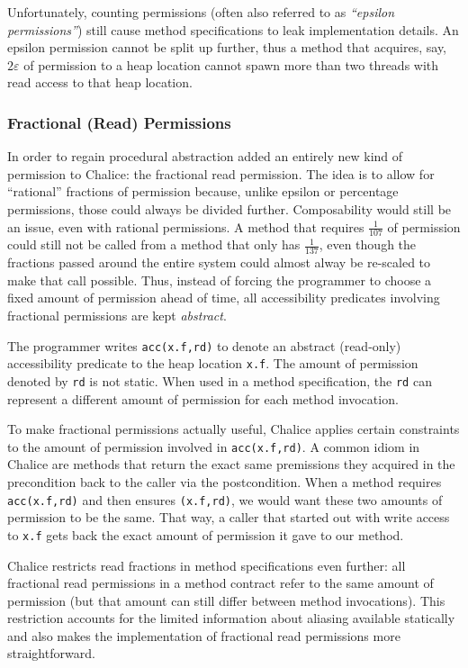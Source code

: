 Unfortunately, counting permissions (often also referred to as \emph{``epsilon permissions''}) still cause method specifications to leak implementation details. 
An epsilon permission cannot be split up further, thus a method that acquires, say, $2 \varepsilon$ of permission to a heap location cannot spawn more than two threads with read access to that heap location.

\subsubsection{Fractional (Read) Permissions}
In order to regain procedural abstraction \cite{HLMS11} added an entirely new kind of permission to Chalice: the fractional read permission. 
The idea is to allow for ``rational'' fractions of permission because, unlike epsilon or percentage permissions, those could always be divided further. 
Composability would still be an issue, even with rational permissions. 
A method that requires $\tfrac{1}{107}$ of permission could still not be called from a method that only has $\tfrac{1}{137}$, even though the fractions passed around the entire system could almost alway be re-scaled to make that call possible.
Thus, instead of forcing the programmer to choose a fixed amount of permission ahead of time, all accessibility predicates involving fractional permissions are kept \emph{abstract}.

The programmer writes \lstinline!acc(x.f,rd)! to denote an abstract (read-only) accessibility predicate to the heap location \lstinline!x.f!. 
The amount of permission denoted by \lstinline!rd! is not static. 
When used in a method specification, the \lstinline!rd! can represent a different amount of permission for each method invocation.

To make fractional permissions actually useful, Chalice applies certain constraints to the amount of permission involved in \lstinline!acc(x.f,rd)!. 
A common idiom in Chalice are methods that return the exact same premissions they acquired in the precondition back to the caller via the postcondition.
When a method requires \lstinline!acc(x.f,rd)! and then ensures \lstinline!(x.f,rd)!, we would want these two amounts of permission to be the same. 
That way, a caller that started out with write access to \lstinline!x.f! gets back the exact amount of permission it gave to our method.

Chalice restricts read fractions in method specifications even further: all fractional read permissions in a method contract refer to the same amount of permission (but that amount can still differ between method invocations).
This restriction accounts for the limited information about aliasing available statically and also makes the implementation of fractional read permissions more straightforward.

